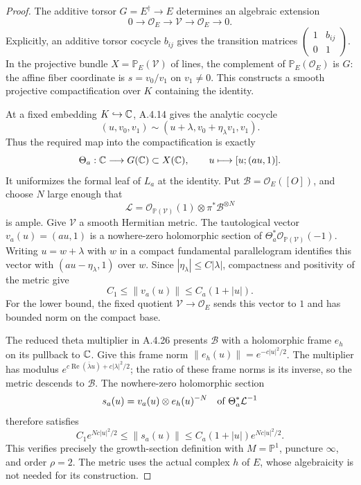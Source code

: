\begin{proof}
The additive torsor $G=E^\dagger\to E$ determines an algebraic
extension
\[
 0\longrightarrow\mathcal O_E\longrightarrow\mathcal V
 \longrightarrow\mathcal O_E\longrightarrow0.
\]
Explicitly, an additive torsor cocycle $b_{ij}$ gives the transition
matrices $\left(\begin{smallmatrix}1&b_{ij}\\0&1\end{smallmatrix}\right)$.
In the projective bundle $X=\mathbb P_E(\mathcal V)$ of lines,
the complement of $\mathbb P_E(\mathcal O_E)$ is $G$:
the affine fiber coordinate is $s=v_0/v_1$ on $v_1\ne0$.
This constructs a smooth projective compactification over $K$
containing the identity.

At a fixed embedding $K\hookrightarrow\mathbb C$, A.4.14 gives the
analytic cocycle
\[
 (u,v_0,v_1)\sim
 (u+\lambda,v_0+\eta_\lambda v_1,v_1).
\]
Thus the required map into the compactification is exactly
\[
 \Theta_a:\mathbb C\longrightarrow G(\mathbb C)\subset X(\mathbb C),\qquad
 u\longmapsto[u;(au,1)].
\]
It uniformizes the formal leaf of $L_a$ at the identity.
Put $\mathcal B=\mathcal O_E([O])$, and choose $N$ large enough
that
\[
 \mathcal L=\mathcal O_{\mathbb P(\mathcal V)}(1)
                  \otimes\pi^*\mathcal B^{\otimes N}
\]
is ample. Give $\mathcal V$ a smooth Hermitian metric. The
tautological vector $v_a(u)=(au,1)$ is a nowhere-zero holomorphic
section of $\Theta_a^*\mathcal O_{\mathbb P(\mathcal V)}(-1)$.
Writing $u=w+\lambda$ with $w$ in a compact fundamental
parallelogram identifies this vector with
$(au-\eta_\lambda,1)$ over $w$. Since
$|\eta_\lambda|\le C|\lambda|$, compactness and positivity of
the metric give
\[
 C_1\le\|v_a(u)\|\le C_a(1+|u|).
\]
For the lower bound, the fixed quotient
$\mathcal V\to\mathcal O_E$ sends this vector to $1$ and has
bounded norm on the compact base.

The reduced theta multiplier in A.4.26 presents
$\mathcal B$ with a holomorphic frame $e_h$ on its pullback
to $\mathbb C$. Give this frame norm
$\|e_h(u)\|=e^{-c|u|^2/2}$.
The multiplier has modulus
$e^{c\operatorname{Re}(\bar\lambda u)+c|\lambda|^2/2}$;
the ratio of these frame norms is its inverse, so the metric
descends to $\mathcal B$.
The nowhere-zero holomorphic section
\[
 s_a(u)=v_a(u)\otimes e_h(u)^{-N}
       \quad\hbox{of }\Theta_a^*\mathcal L^{-1}
\]
therefore satisfies
\[
 C_1e^{Nc|u|^2/2}\le\|s_a(u)\|
      \le C_a(1+|u|)e^{Nc|u|^2/2}.                 \tag{*}
\]
This verifies precisely the growth-section definition
\cite[Definition 5.1, p.29; Definitions 5.4--5.5, p.31]{EllHerblot2012}
with $M=\mathbb P^1$, puncture $\infty$, and order $\rho=2$.
The metric uses the actual complex $h$ of $E$, whose algebraicity
is not needed for its construction.


\end{proof}
